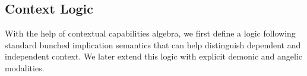 
\subsection{Context Logic}

With the help of contextual capabilities algebra, we first define a logic following standard bunched implication semantics that can help distinguish dependent and independent context. We later extend this logic with explicit demonic and angelic modalities.

